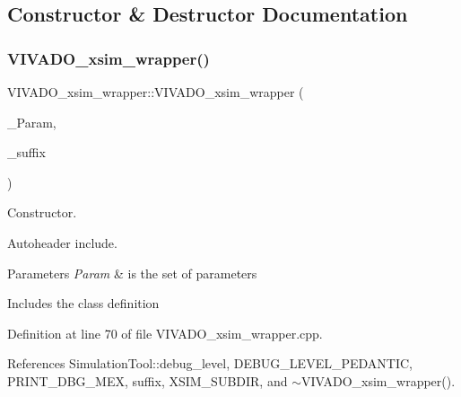 \subsection{Constructor \& Destructor Documentation}
\mbox{\label{classVIVADO__xsim__wrapper_a9f6e3b67622e26c6fd19d315bab1f7c4}} 
\subsubsection{\texorpdfstring{V\+I\+V\+A\+D\+O\+\_\+xsim\+\_\+wrapper()}{VIVADO\_xsim\_wrapper()}}
{\footnotesize\ttfamily V\+I\+V\+A\+D\+O\+\_\+xsim\+\_\+wrapper\+::\+V\+I\+V\+A\+D\+O\+\_\+xsim\+\_\+wrapper (\begin{DoxyParamCaption}\item[{const \hyperlink{Parameter_8hpp_a37841774a6fcb479b597fdf8955eb4ea}{Parameter\+Const\+Ref} \&}]{\+\_\+\+Param,  }\item[{std\+::string}]{\+\_\+suffix }\end{DoxyParamCaption})}



Constructor. 

Autoheader include.


\begin{DoxyParams}{Parameters}
{\em Param} & is the set of parameters\\
\hline
\end{DoxyParams}
Includes the class definition 

Definition at line 70 of file V\+I\+V\+A\+D\+O\+\_\+xsim\+\_\+wrapper.\+cpp.



References Simulation\+Tool\+::debug\+\_\+level, D\+E\+B\+U\+G\+\_\+\+L\+E\+V\+E\+L\+\_\+\+P\+E\+D\+A\+N\+T\+IC, P\+R\+I\+N\+T\+\_\+\+D\+B\+G\+\_\+\+M\+EX, suffix, X\+S\+I\+M\+\_\+\+S\+U\+B\+D\+IR, and $\sim$\+V\+I\+V\+A\+D\+O\+\_\+xsim\+\_\+wrapper().

